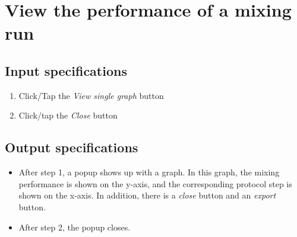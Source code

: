\section{View the performance of a mixing run}

\subsection*{Input specifications}
\begin{enumerate}
\item Click/Tap the \emph{View single graph} button
\item Click/tap the \emph{Close} button
\end{enumerate}

\subsection*{Output specifications}
\begin{itemize}
\item After step 1, a popup shows up with a graph. In this graph, the mixing performance is shown on the y-axis, and the corresponding protocol step is shown on the x-axis. In addition, there is a \emph{close} button and an \emph{export} button.
\item After step 2, the popup closes.
\end{itemize}

